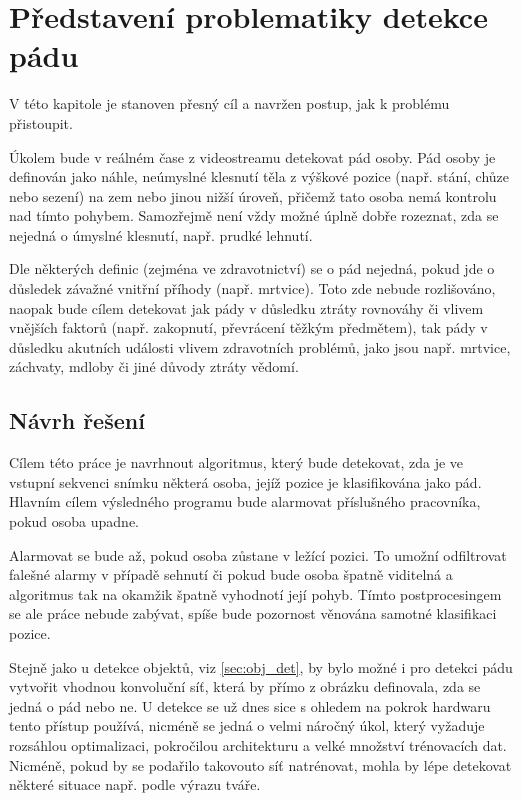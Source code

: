 \chapter{Představení problematiky detekce pádu}
\label{chap:Goal}

V této kapitole je stanoven přesný cíl a navržen postup, jak k problému
přistoupit.

Úkolem bude v reálném čase z videostreamu detekovat pád osoby. Pád osoby
je definován jako náhle, neúmyslné klesnutí těla z výškové pozice (např. stání,
chůze nebo sezení) na zem nebo jinou nižší úroveň, přičemž tato osoba nemá
kontrolu nad tímto pohybem. Samozřejmě není vždy možné úplně dobře
rozeznat, zda se nejedná o úmyslné klesnutí, např. prudké lehnutí.

Dle některých definic (zejména ve zdravotnictví) se o pád nejedná, pokud jde o
důsledek závažné vnitřní příhody (např. mrtvice). Toto zde nebude rozlišováno,
naopak bude cílem detekovat jak pády v důsledku ztráty rovnováhy či vlivem
vnějších faktorů (např. zakopnutí, převrácení těžkým předmětem), tak pády v
důsledku akutních události vlivem zdravotních problémů, jako jsou např.
mrtvice, záchvaty, mdloby či jiné důvody ztráty vědomí.

\section{Návrh řešení}

Cílem této práce je navrhnout algoritmus, který bude detekovat, zda je ve
vstupní sekvenci snímku některá osoba, jejíž pozice je klasifikována jako pád.
Hlavním cílem výsledného programu bude alarmovat příslušného pracovníka, pokud
osoba upadne.

Alarmovat se bude až, pokud osoba zůstane v ležící pozici. To umožní
odfiltrovat falešné alarmy v případě sehnutí či pokud bude osoba špatně
viditelná a algoritmus tak na okamžik špatně vyhodnotí její pohyb. Tímto
postprocesingem se ale práce nebude zabývat, spíše bude pozornost věnována
samotné klasifikaci pozice.

Stejně jako u detekce objektů, viz \ref{sec:obj_det}, by bylo možné i pro
detekci pádu vytvořit vhodnou konvoluční síť, která by přímo z obrázku
definovala, zda se jedná o pád nebo ne. U detekce se už dnes sice s ohledem na
pokrok hardwaru tento přístup používá, nicméně se jedná o velmi náročný úkol,
který vyžaduje rozsáhlou optimalizaci, pokročilou architekturu a velké množství
trénovacích dat. Nicméně, pokud by se podařilo takovouto síť natrénovat, mohla
by lépe detekovat některé situace např. podle výrazu tváře.

